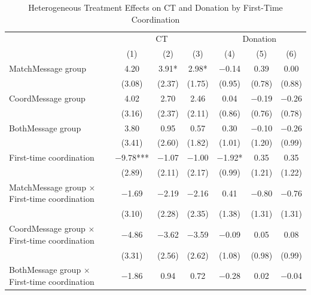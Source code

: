 \documentclass[12pt, a4paper]{article}
\begin{document}
\begin{table}[H]

\caption{\label{tab:lm-interaction-coordination1-test-donate}Heterogeneous Treatment Effects on CT and Donation by First-Time Coordination}
\centering
\fontsize{8}{10}\selectfont
\begin{threeparttable}
\begin{tabular}[t]{>{\raggedright\arraybackslash}p{30em}cccccc}
\toprule
\multicolumn{1}{c}{ } & \multicolumn{3}{c}{CT} & \multicolumn{3}{c}{Donation} \\
\cmidrule(l{3pt}r{3pt}){2-4} \cmidrule(l{3pt}r{3pt}){5-7}
  & (1) & (2) & (3) & (4) & (5) & (6)\\
\midrule
MatchMessage group & \num{4.20} & \num{3.91}* & \num{2.98}* & \num{-0.14} & \num{0.39} & \num{0.00}\\
 & (\num{3.08}) & (\num{2.37}) & (\num{1.75}) & (\num{0.95}) & (\num{0.78}) & (\num{0.88})\\
CoordMessage group & \num{4.02} & \num{2.70} & \num{2.46} & \num{0.04} & \num{-0.19} & \num{-0.26}\\
 & (\num{3.16}) & (\num{2.37}) & (\num{2.11}) & (\num{0.86}) & (\num{0.76}) & (\num{0.78})\\
BothMessage group & \num{3.80} & \num{0.95} & \num{0.57} & \num{0.30} & \num{-0.10} & \num{-0.26}\\
 & (\num{3.41}) & (\num{2.60}) & (\num{1.82}) & (\num{1.01}) & (\num{1.20}) & (\num{0.99})\\
First-time coordination & \num{-9.78}*** & \num{-1.07} & \num{-1.00} & \num{-1.92}* & \num{0.35} & \num{0.35}\\
 & (\num{2.89}) & (\num{2.11}) & (\num{2.17}) & (\num{0.99}) & (\num{1.21}) & (\num{1.22})\\
MatchMessage group $\times$ First-time coordination & \num{-1.69} & \num{-2.19} & \num{-2.16} & \num{0.41} & \num{-0.80} & \num{-0.76}\\
 & (\num{3.10}) & (\num{2.28}) & (\num{2.35}) & (\num{1.38}) & (\num{1.31}) & (\num{1.31})\\
CoordMessage group $\times$ First-time coordination & \num{-4.86} & \num{-3.62} & \num{-3.59} & \num{-0.09} & \num{0.05} & \num{0.08}\\
 & (\num{3.31}) & (\num{2.56}) & (\num{2.62}) & (\num{1.08}) & (\num{0.98}) & (\num{0.99})\\
BothMessage group $\times$ First-time coordination & \num{-1.86} & \num{0.94} & \num{0.72} & \num{-0.28} & \num{0.02} & \num{-0.04}\\

\end{tabular}
\end{threeparttable}
\end{table}
\end{document}
